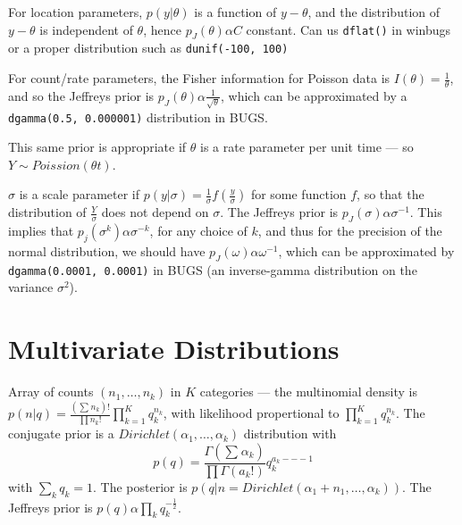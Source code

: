 \begin{defn}
  \label{sec:prior-distributions-4}
  For location parameters, $p(y|\theta)$ is a function of $y -
  \theta$, and the distribution of $y - \theta$ is independent of
  $\theta$, hence $p_{J}(\theta) \alpha C$ constant. Can us
  \texttt{dflat()} in winbugs or a proper distribution such as
  \texttt{dunif(-100, 100)}
\end{defn}

\begin{defn}
  \label{sec:prior-distributions-5}
  For count/rate parameters, the Fisher information for Poisson data
  is $I(\theta) = \frac{1}{\theta}$, and so the Jeffreys prior is
  $p_{J}(\theta) \alpha \frac{1}{\sqrt{\theta}}$, which can be
  approximated by a \texttt{dgamma(0.5, 0.000001)} distribution in
  BUGS.

  This same prior is appropriate if $\theta$ is a rate parameter per
  unit time --- so $Y \sim Poission(\theta t)$.
\end{defn}

\begin{defn}
  \label{sec:prior-distributions-6}
  $\sigma$ is a scale parameter if $p(y | \sigma) = \frac{1}{\sigma}
  f(\frac{y}{\sigma})$ for some function $f$, so that the distribution
  of $\frac{Y}{\sigma} $ does not depend on $\sigma$. The Jeffreys
  prior is $p_{J}(\sigma) \alpha \sigma^{-1}$. This implies that
  $p_{j}(\sigma^{k}) \alpha \sigma^{-k}$, for any choice of $k$, and
  thus for the precision of the normal distribution, we should have
  $p_{J}(\omega) \alpha \omega^{-1}$, which can be approximated by
  \texttt{dgamma(0.0001, 0.0001)} in BUGS (an inverse-gamma
  distribution on the variance $\sigma^{2}$).
\end{defn}


\section{Multivariate Distributions}
\label{sec:mult-distr}

\begin{defn}
\label{sec:mult-distr-1}
  Array of counts $(n_{1}, \dots, n_{k})$ in $K$ categories --- the
  multinomial density is $p(n|q) = \frac{(\sum_{}^{} n_{k})!}{\prod
    n_{k}!} \prod_{k=1}^{K} q_{k}^{n_{k}}$, with likelihood
  propertional to $\prod_{k=1}^{K} q_{k}^{n_{k}}$. The conjugate prior
  is a $Dirichlet(\alpha_{1}, \dots, \alpha_{k})$ distribution with
  \begin{equation}
    \label{eq:15}
    p(q) = \frac{\Gamma(\sum_{}^{} \alpha_{k})}{\prod \Gamma(a_{k}!)}
    q_{k}^{a_{k} --- 1}
  \end{equation}  with $\sum_{k}^{} q_{k} = 1$.  The posterior is $p(q|n
  = Dirichlet(\alpha_{1} + n_{1}, \dots, \alpha_{k}))$.  The Jeffreys
  prior is $p(q) \alpha \prod_{k} q_{k}^{-\frac{1}{2}}$.
\end{defn}

